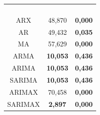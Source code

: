 \begin{table}[H]
\begin{subtable}{0.46\linewidth}
\begin{tabular}{@{}ccc@{}}
			& & \\
			& & \\
			& & \\
			& & \\ \midrule
		ARX & 48,870 & \textbf{0,000} \\
		AR & 49,432 & \textbf{0,035} \\
		MA & 57,629 & \textbf{0,000} \\
		ARMA & \textbf{10,053} & \textbf{0,436} \\
		ARIMA & \textbf{10,053} & \textbf{0,436} \\
		SARIMA & \textbf{10,053} & \textbf{0,436} \\
		ARIMAX & 70,458 & \textbf{0,000} \\
		SARIMAX & \textbf{2,897} & \textbf{0,000} \\ \bottomrule
		\end{tabular}
	\end{subtable}
	
	
	\vspace{0.5cm}
	
\end{table}





